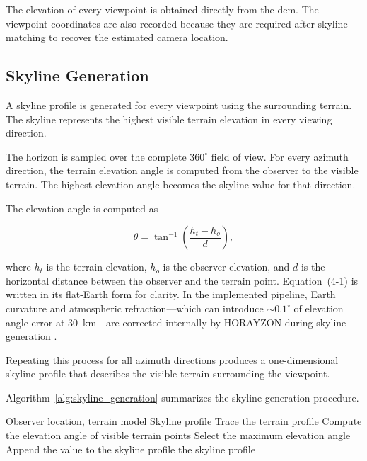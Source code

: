 The elevation of every viewpoint is obtained directly from the \gls{dem}. The viewpoint coordinates are also recorded because they are required after skyline matching to recover the estimated camera location.

\subsection{Skyline Generation}

A skyline profile is generated for every viewpoint using the surrounding terrain. The skyline represents the highest visible terrain elevation in every viewing direction.

The horizon is sampled over the complete $360^\circ$ field of view. For every azimuth direction, the terrain elevation angle is computed from the observer to the visible terrain. The highest elevation angle becomes the skyline value for that direction.

The elevation angle is computed as

\begin{equation}
\theta=\tan^{-1}\left(\frac{h_t-h_o}{d}\right),
\label{eq:elevation_angle}
\end{equation}

where $h_t$ is the terrain elevation, $h_o$ is the observer elevation, and $d$ is the horizontal distance between the observer and the terrain point. Equation~(4-1) is written in its flat-Earth form for clarity. In the implemented pipeline, Earth curvature and atmospheric refraction---which can introduce $\sim 0.1^\circ$ of elevation angle error at 30~km---are corrected internally by HORAYZON during skyline generation \cite{steger2022horayzon}.

Repeating this process for all azimuth directions produces a one-dimensional skyline profile that describes the visible terrain surrounding the viewpoint.

Algorithm~\ref{alg:skyline_generation} summarizes the skyline generation procedure.

\begin{algorithm}[!ht]
\caption{Reference Skyline Generation}
\label{alg:skyline_generation}
\begin{algorithmic}[1]
\Require Observer location, terrain model
\Ensure Skyline profile
\State Trace the terrain profile
\State Compute the elevation angle of visible terrain points
\State Select the maximum elevation angle
\State Append the value to the skyline profile
\EndFor
\State \Return the skyline profile
\end{algorithmic}
\end{algorithm}


